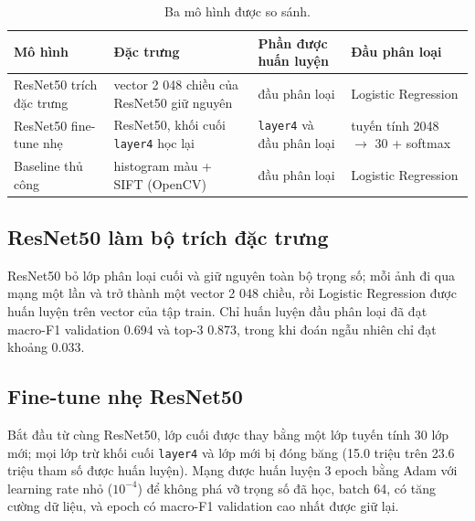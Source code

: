 \begin{table}[H]\centering
\caption{Ba mô hình được so sánh.}\label{tab:img-models}
\begin{tabular}{>{\raggedright\arraybackslash}p{3.6cm}>{\raggedright\arraybackslash}p{4.2cm}>{\raggedright\arraybackslash}p{3.2cm}>{\raggedright\arraybackslash}p{3.2cm}}
\toprule
Mô hình & Đặc trưng & Phần được huấn luyện & Đầu phân loại \\
\midrule
ResNet50 trích đặc trưng & vector 2 048 chiều của ResNet50 giữ nguyên & đầu phân loại & Logistic Regression \\
ResNet50 fine-tune nhẹ & ResNet50, khối cuối \texttt{layer4} học lại & \texttt{layer4} và đầu phân loại & tuyến tính 2048 $\rightarrow$ 30 + softmax \\
Baseline thủ công & histogram màu + SIFT (OpenCV) & đầu phân loại & Logistic Regression \\
\bottomrule
\end{tabular}
\end{table}

\subsection{ResNet50 làm bộ trích đặc trưng}

ResNet50 bỏ lớp phân loại cuối và giữ nguyên toàn bộ trọng số; mỗi ảnh đi qua mạng một lần và trở thành một vector
2 048 chiều, rồi Logistic Regression được huấn luyện trên vector của tập train. Chỉ huấn luyện đầu phân loại đã đạt
macro-F1 validation 0.694 và top-3 0.873, trong khi đoán ngẫu nhiên chỉ đạt khoảng 0.033.

\subsection{Fine-tune nhẹ ResNet50}

Bắt đầu từ cùng ResNet50, lớp cuối được thay bằng một lớp tuyến tính 30 lớp mới; mọi lớp trừ khối cuối \texttt{layer4}
và lớp mới bị đóng băng (15.0 triệu trên 23.6 triệu tham số được huấn luyện). Mạng được huấn luyện 3 epoch bằng Adam với
learning rate nhỏ ($10^{-4}$) để không phá vỡ trọng số đã học, batch 64, có tăng cường dữ liệu, và epoch có macro-F1
validation cao nhất được giữ lại.


